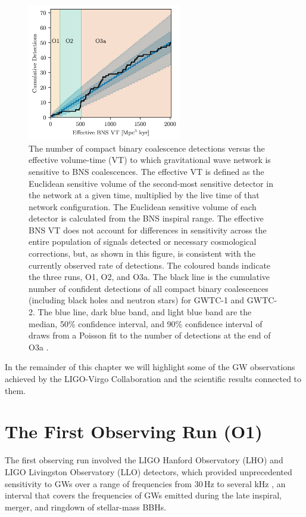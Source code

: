 \documentclass[binding=0.6cm, LaM]{sapthesis}
\begin{document}
        \begin{figure}[!t]
          \label{o3detection}
          \includegraphics[width=0.6\textwidth]{o3detection}
          \centering
          \caption{The number of compact binary coalescence detections versus the effective volume-time (VT) to which gravitational wave network is sensitive to BNS coalescences. The effective VT is defined as the Euclidean sensitive volume of the second-most sensitive detector in the network at a given time, multiplied by the live time of that network configuration. The Euclidean sensitive volume of each detector is calculated from the BNS inspiral range. The effective BNS VT does not account for differences in sensitivity across the entire population of signals detected or necessary cosmological corrections, but, as shown in this figure, is consistent with the currently observed rate of detections. The coloured bands indicate the three runs, O1, O2, and O3a. The black line is the cumulative number of confident detections of all compact binary coalescences (including black holes and neutron stars) for GWTC-1 and GWTC-2. The blue line, dark blue band, and light blue band are the median, 50\% confidence interval, and 90\% confidence interval of draws from a Poisson fit to the number of detections at the end of O3a \cite{49}.}
          \label{fig:o3detection}
        \end{figure}

        In the remainder of this chapter we will highlight some of the GW observations achieved 
	by the LIGO-Virgo Collaboration and the scientific results connected to them.

\section{The First Observing Run (O1)}
	The first observing run involved the LIGO Hanford Observatory (LHO) and LIGO Livingston Observatory (LLO) detectors, 
	which provided unprecedented sensitivity to GWs
	over a range of frequencies from 30\,Hz to several kHz \cite{14}, an interval that
	covers the frequencies of GWs emitted during 
	the late inspiral, merger, and ringdown of stellar-mass BBHs.
\end{document}
